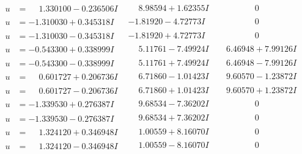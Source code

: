 \documentclass[1p]{elsarticle_modified}
\theoremstyle{definition}
\begin{document}
$$\begin{array}{c|c|c}
\begin{aligned}
u &= \phantom{-}1.330100 - 0.236506 I\end{aligned}
 & \phantom{-}8.98594 + 1.62355 I & \phantom{-0.000000 } 0 \\ \hline\begin{aligned}
u &= -1.310030 + 0.345318 I\end{aligned}
 & -1.81920 - 4.72773 I & \phantom{-0.000000 } 0 \\ \hline\begin{aligned}
u &= -1.310030 - 0.345318 I\end{aligned}
 & -1.81920 + 4.72773 I & \phantom{-0.000000 } 0 \\ \hline\begin{aligned}
u &= -0.543300 + 0.338999 I\end{aligned}
 & \phantom{-}5.11761 - 7.49924 I & \phantom{-}6.46948 + 7.99126 I \\ \hline\begin{aligned}
u &= -0.543300 - 0.338999 I\end{aligned}
 & \phantom{-}5.11761 + 7.49924 I & \phantom{-}6.46948 - 7.99126 I \\ \hline\begin{aligned}
u &= \phantom{-}0.601727 + 0.206736 I\end{aligned}
 & \phantom{-}6.71860 - 1.01423 I & \phantom{-}9.60570 - 1.23872 I \\ \hline\begin{aligned}
u &= \phantom{-}0.601727 - 0.206736 I\end{aligned}
 & \phantom{-}6.71860 + 1.01423 I & \phantom{-}9.60570 + 1.23872 I \\ \hline\begin{aligned}
u &= -1.339530 + 0.276387 I\end{aligned}
 & \phantom{-}9.68534 - 7.36202 I & \phantom{-0.000000 } 0 \\ \hline\begin{aligned}
u &= -1.339530 - 0.276387 I\end{aligned}
 & \phantom{-}9.68534 + 7.36202 I & \phantom{-0.000000 } 0 \\ \hline\begin{aligned}
u &= \phantom{-}1.324120 + 0.346948 I\end{aligned}
 & \phantom{-}1.00559 + 8.16070 I & \phantom{-0.000000 } 0 \\ \hline\begin{aligned}
u &= \phantom{-}1.324120 - 0.346948 I\end{aligned}
 & \phantom{-}1.00559 - 8.16070 I & \phantom{-0.000000 } 0 \\ \hline\begin{aligned}

\end{aligned}
\end{array}$$
\end{document}
